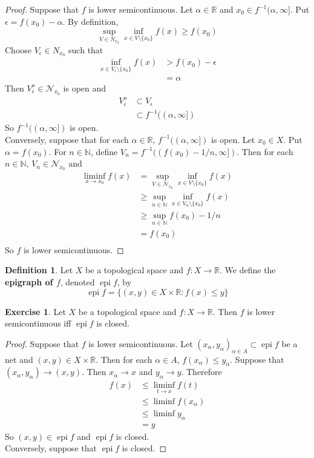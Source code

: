 \documentclass[12pt]{amsart}
\theoremstyle{definition}
\newtheorem{defn}[definition]{Definition}
\newtheorem{ex}[definition]{Exercise}
\newcommand{\al}{\alpha}
\newcommand{\ep}{\epsilon}
\newcommand{\N}{\mathbb{N}}
\newcommand{\R}{\mathbb{R}}
\newcommand{\MN}{\mathcal{N}}
\newcommand{\lsc}{lower semicontinuous}
\DeclareMathOperator{\epi}{epi}
\begin{document}
	\begin{proof}
	Suppose that $f$ is \lsc. Let $\al \in \R$ and $x_0 \in f^{-1}(\al, \infty]$. Put $\ep = f(x_0) - \al$. By definition, $$\sup_{V \in N_{x_0}} \inf_{x \in V \setminus \{x_0\}} f(x) \geq f(x_0)$$ Choose $V_{\ep} \in N_{x_0}$ such that 
	\begin{align*}
	\inf_{x \in V_{\ep} \setminus \{x_0\}} f(x)  
	&> f(x_0) - \ep \\
	&= \al
\end{align*}
Then $V_{\ep}^o \in \MN_{x_0}$ is open and 
	\begin{align*}
		V_{\ep}^o 
		& \subset V_{\ep} \\
		&\subset f^{-1}((\al, \infty])
	\end{align*} 
	So $f^{-1}((\al, \infty])$ is open. \\
	Conversely, suppose that for each $\al \in \R$, $f^{-1}((\al, \infty])$ is open. Let $x_0 \in X$. Put $\al = f(x_0)$. For $n \in \N$, define $V_n = f^{-1}((f(x_0)-1/n, \infty]) $. Then for each $n \in \N$, $V_n \in \MN_{x_0}$ and 
	\begin{align*}
	\liminf_{x \rightarrow x_0} f(x) 
	&= \sup_{V \in \MN_{x_0}} \inf_{x \in V \setminus \{x_0\}} f(x) \\
	& \geq \sup_{n \in \N} \inf_{x \in V_n \setminus \{x_0\}} f(x) \\
	& \geq \sup_{n \in \N} f(x_0)-1/n \\
	&= f(x_0) \\
	\end{align*}
	So $f$ is \lsc.
	\end{proof}

	\begin{defn}
		Let $X$ be a topological space and $f: X \rightarrow \R$. We define the \textbf{epigraph of $f$}, denoted $\epi f$, by 
		$$\epi f = \{(x, y) \in X \times \R: f(x) \leq y\}$$
	\end{defn}

	\begin{ex}
		Let $X$ be a topological space and $f: X \rightarrow \R$. Then $f$ is lower semicontinuous iff $\epi f$ is closed.
	\end{ex}

	\begin{proof}
		Suppose that $f$ is lower semicontinuous. Let $(x_{\al}, y_{\al})_{\al \in A} \subset \epi f$ be a net and $(x, y) \in X \times \R$. Then for each $\al \in A$, $f(x_{\al}) \leq y_{\al}$. Suppose that $(x_{\al}, y_{\al}) \rightarrow (x, y)$. Then $x_{\al} \rightarrow x$ and $y_{\al} \rightarrow y$. Therefore 
		\begin{align*}
			f(x) 
			& \leq \liminf_{t \rightarrow x} f(t) \\
			& \leq \liminf f(x_{\al}) \\
			& \leq \liminf y_{\al} \\
			&= y 
		\end{align*}
	So $(x, y) \in \epi f$ and $\epi f$ is closed. \\
	Conversely, suppose that $\epi f$ is closed. 
	\end{proof}
\end{document}
